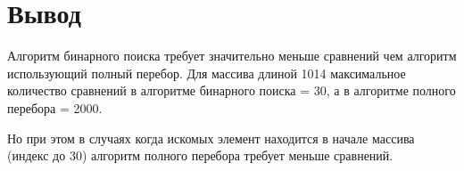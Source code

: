 \section{Вывод}
Алгоритм бинарного поиска требует значительно меньше сравнений чем алгоритм использующий полный перебор. Для массива длиной 1014 максимальное количество сравнений в алгоритме бинарного поиска = 30, а в алгоритме полного перебора = 2000. 

Но при этом в случаях когда искомых элемент находится в начале массива (индекс до 30) алгоритм полного перебора требует меньше сравнений.

\clearpage
